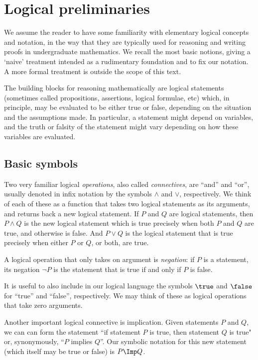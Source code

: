 

\section{Logical preliminaries}

We assume the reader to have some familiarity with elementary logical concepts and notation, in the way that they are typically used for reasoning and writing proofs in undergraduate mathematics. We recall the most basic notions, giving a `naive' treatment  intended as a rudimentary foundation and to fix our notation. A more formal treatment is outside the scope of this text. 

The building blocks for reasoning mathematically are logical statements (sometimes called propositions, assertions, logical formulae, etc) which, in principle, may be evaluated to be either true or false, depending on the situation and the assumptions made.  In particular, a statement might depend on variables, and the truth or falsity of the statement might vary depending on how these variables are evaluated. 

\subsection{Basic symbols}

Two very familiar logical \emph{operations}, also called \emph{connectives}, are ``and'' and ``or'', usually denoted in infix notation by the symbols $\wedge$ and $\vee$, respectively. We think of each of these as a function that takes two logical statements as its arguments, and returns back a new logical statement. If $P$ and $Q$ are logical statements, then $P \wedge Q$ is the new logical statement which is true precisely when both $P$ and $Q$ are true, and otherwise is false. And $P \vee Q$ is the logical statement that is true precisely when either $P$ or $Q$, or both, are true.

A logical operation that only takes on argument is \emph{negation}: if $P$ is a statement, its negation $\lnot P$ is the statement that is true if and only if $P$ is false. 

It is useful to also include in our logical language the symbols $\true$ and $\false$ for ``true'' and ``false'', respectively. 
We may think of these as logical operations that take zero arguments. 

Another important logical connective is implication. Given statements $P$ and $Q$, we can can form the statement ``if statement $P$ is true, then statement $Q$ is true" or, synonymously, ``$P$ implies $Q$''. Our symbolic notation for this new statement (which itself may be true or false) is $P \Imp Q$. 

